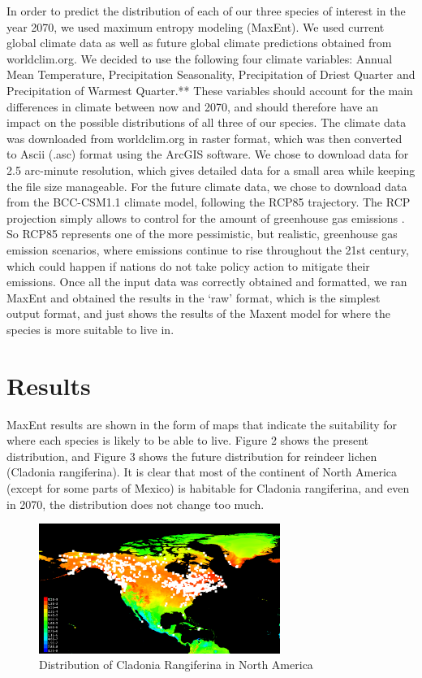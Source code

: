\documentclass[twoside]{article}
\begin{document}
\indent In order to predict the distribution of each of our three species of interest
in the year 2070, we used maximum entropy modeling (MaxEnt). We used current
global climate data as well as future global climate predictions obtained
from worldclim.org. We decided to use the following four climate variables:
Annual Mean Temperature, Precipitation Seasonality, Precipitation of Driest
Quarter and Precipitation of Warmest Quarter.** These variables should account
for the main differences in climate between now and 2070, and should therefore
have an impact on the possible distributions of all three of our species.
The climate data was downloaded from worldclim.org in raster format, which was
then converted to Ascii (.asc) format using the ArcGIS software. We chose to
download data for 2.5 arc-minute resolution, which gives detailed data for a
small area while keeping the file size manageable. For the future climate data,
we chose to download data from the BCC-CSM1.1 climate model, following the
RCP85 trajectory. The RCP projection simply allows to control for the amount
of greenhouse gas emissions \cite{ipcc}. So RCP85 represents one of the more
pessimistic, but realistic, greenhouse gas emission scenarios, where emissions
continue to rise throughout the 21st century, which could happen if nations
do not take policy action to mitigate their emissions. Once all the input data
was correctly obtained and formatted, we ran MaxEnt and obtained the results
in the ‘raw’ format, which is the simplest output format, and just shows the
results of the Maxent model for where the species is more suitable to live in.


\section{Results}
\indent MaxEnt results are shown in the form of maps that indicate the suitability
for where each species is likely to be able to live. Figure 2 shows the
present distribution, and Figure 3 shows the future distribution for
reindeer lichen (Cladonia rangiferina). It is clear that most of the
continent of North America (except for some parts of Mexico) is habitable
for Cladonia rangiferina, and even in 2070, the distribution does not change
too much. \\
\begin{figure}[H]
\centering
\includegraphics[width=0.7\textwidth]{NCladoniaPresent}
\caption{Distribution of Cladonia Rangiferina in North America}
\end{figure}
\end{document}
